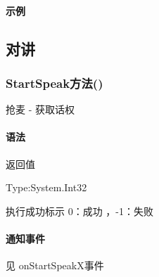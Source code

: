 \documentclass[letterpaper,10pt,english]{sphinxmanual}
\begin{document}
\paragraph{示例}
\label{\detokenize{csharp_activex:id86}}
%
\begin{sphinxVerbatim}[commandchars=\\\{\}]
    
      
\end{sphinxVerbatim}


\subsection{对讲}
\label{\detokenize{csharp_activex:id87}}

\subsubsection{StartSpeak方法()}
\label{\detokenize{csharp_activex:startspeak}}
抢麦 - 获取话权


\paragraph{语法}
\label{\detokenize{csharp_activex:id88}}
%
\begin{sphinxVerbatim}[commandchars=\\\{\}]
  
\end{sphinxVerbatim}

返回值

Type:System.Int32

执行成功标示 0：成功 ，-1：失败


\paragraph{通知事件}
\label{\detokenize{csharp_activex:id89}}
见 onStartSpeakX事件
\end{document}
